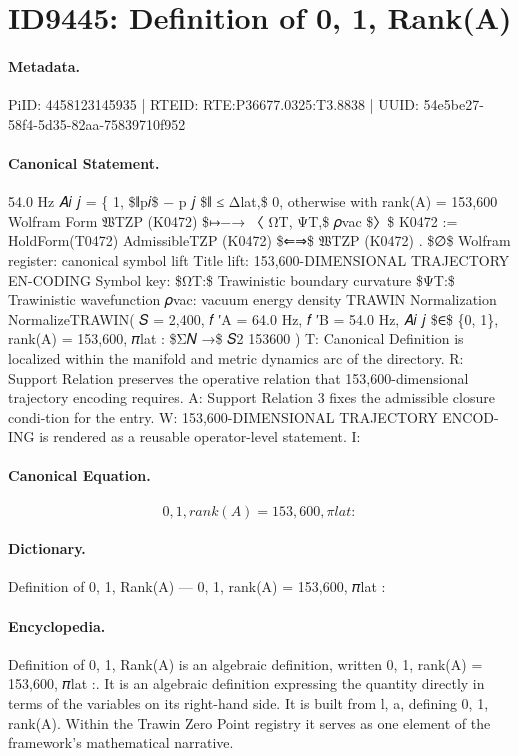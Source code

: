 \section*{ID9445: Definition of 0, 1, Rank(A)}
\paragraph{Metadata.}
PiID: 4458123145935 | RTEID: RTE:P36677.0325:T3.8838 | UUID: 54e5be27-58f4-5d35-82aa-75839710f952

\paragraph{Canonical Statement.}
54.0 Hz 𝐴𝑖 𝑗 = \{ 1, \$∥p𝑖\$ − p 𝑗 \$∥ ≤ Δlat,\$ 0, otherwise with rank(A) = 153,600 Wolfram Form 𝔚TZP (K0472) \$↦−→ 〈 ΩT, ΨT,\$ 𝜌vac \$〉\$ K0472 := HoldForm(T0472) AdmissibleTZP (K0472) \$⇐⇒\$ 𝔚TZP (K0472) . \$∅\$ Wolfram register: canonical symbol lift Title lift: 153,600-DIMENSIONAL TRAJECTORY EN-CODING Symbol key: \$ΩT:\$ Trawinistic boundary curvature \$ΨT:\$ Trawinistic wavefunction 𝜌vac: vacuum energy density TRAWIN Normalization NormalizeTRAWIN( 𝑆 = 2,400, 𝑓 ′A = 64.0 Hz, 𝑓 ′B = 54.0 Hz, 𝐴𝑖 𝑗 \$∈\$ \{0, 1\}, rank(A) = 153,600, 𝜋lat : \$Σ𝑁 →\$ 𝑆2 153600 ) T: Canonical Definition is localized within the manifold and metric dynamics arc of the directory. R: Support Relation preserves the operative relation that 153,600-dimensional trajectory encoding requires. A: Support Relation 3 fixes the admissible closure condi-tion for the entry. W: 153,600-DIMENSIONAL TRAJECTORY ENCOD-ING is rendered as a reusable operator-level statement. I:

\paragraph{Canonical Equation.}
\[
{0, 1}, rank(A) = 153,600, 𝜋lat :
\]

\paragraph{Dictionary.}
Definition of 0, 1, Rank(A) — 0, 1, rank(A) = 153,600, 𝜋lat :

\paragraph{Encyclopedia.}
Definition of 0, 1, Rank(A) is an algebraic definition, written 0, 1, rank(A) = 153,600, 𝜋lat :. It is an algebraic definition expressing the quantity directly in terms of the variables on its right-hand side. It is built from l, a, defining 0, 1, rank(A). Within the Trawin Zero Point registry it serves as one element of the framework's mathematical narrative.
